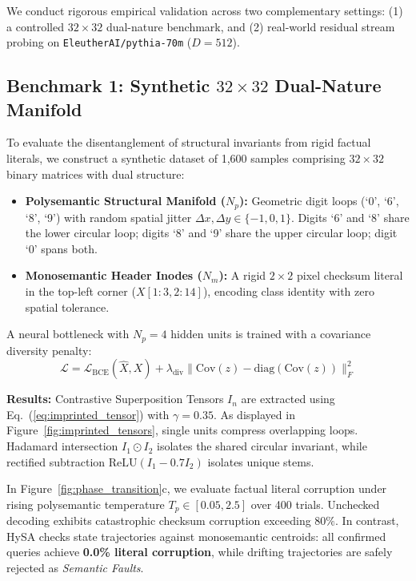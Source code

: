 \documentclass[10pt,twocolumn]{article}
\theoremstyle{definition}
\begin{document}
We conduct rigorous empirical validation across two complementary settings: (1) a controlled $32 \times 32$ dual-nature benchmark, and (2) real-world residual stream probing on \texttt{EleutherAI/pythia-70m} ($D=512$).

\subsection{Benchmark 1: Synthetic \texorpdfstring{$32 \times 32$}{32x32} Dual-Nature Manifold}
To evaluate the disentanglement of structural invariants from rigid factual literals, we construct a synthetic dataset of 1,600 samples comprising $32 \times 32$ binary matrices with dual structure:
\begin{itemize}[leftmargin=*, itemsep=1.5pt]
    \item \textbf{Polysemantic Structural Manifold ($N_p$):} Geometric digit loops (`0', `6', `8', `9') with random spatial jitter $\Delta x, \Delta y \in \{-1, 0, 1\}$. Digits `6' and `8' share the lower circular loop; digits `8' and `9' share the upper circular loop; digit `0' spans both.
    \item \textbf{Monosemantic Header Inodes ($N_m$):} A rigid $2 \times 2$ pixel checksum literal in the top-left corner ($X[1:3, 2:14]$), encoding class identity with zero spatial tolerance.
\end{itemize}

A neural bottleneck with $N_p=4$ hidden units is trained with a covariance diversity penalty:
\begin{equation}
    \mathcal{L} = \mathcal{L}_{\mathrm{BCE}}(\hat{X}, X) + \lambda_{\mathrm{div}} \|\mathrm{Cov}(z) - \mathrm{diag}(\mathrm{Cov}(z))\|_F^2
\end{equation}

\textbf{Results:} Contrastive Superposition Tensors $I_n$ are extracted using Eq.~(\ref{eq:imprinted_tensor}) with $\gamma = 0.35$. As displayed in Figure~\ref{fig:imprinted_tensors}, single units compress overlapping loops. Hadamard intersection $I_1 \odot I_2$ isolates the shared circular invariant, while rectified subtraction $\mathrm{ReLU}(I_1 - 0.7 I_2)$ isolates unique stems. 

In Figure~\ref{fig:phase_transition}c, we evaluate factual literal corruption under rising polysemantic temperature $T_p \in [0.05, 2.5]$ over 400 trials. Unchecked decoding exhibits catastrophic checksum corruption exceeding $80\%$. In contrast, HySA checks state trajectories against monosemantic centroids: all confirmed queries achieve \textbf{0.0\% literal corruption}, while drifting trajectories are safely rejected as \textit{Semantic Faults}.
\end{document}
